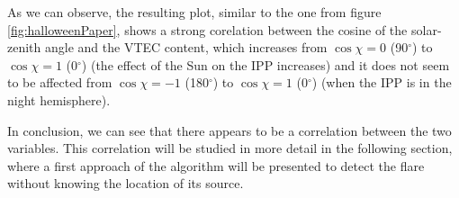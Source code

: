 As we can observe, the resulting plot, similar to the one from figure \ref{fig:halloweenPaper}, shows a strong corelation between the cosine of the solar-zenith angle and the VTEC content, which increases from $\cos\chi = 0$ (90$^{\circ}$) to $\cos\chi = 1$ (0$^{\circ}$) (the effect of the Sun on the IPP increases) and it does not seem to be affected from $\cos\chi = -1$ (180$^{\circ}$) to $\cos\chi = 1$ (0$^{\circ}$) (when the IPP is in the night hemisphere).

In conclusion, we can see that there appears to be a correlation between the two variables. This correlation will be studied in more detail in the following section, where a first approach of the algorithm will be presented to detect the flare without knowing the location of its source.













